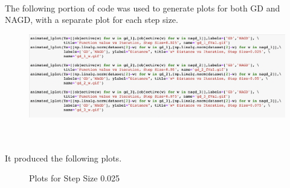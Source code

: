 \documentclass[12pt, letterpaper]{article}
\begin{document}
\\
The following portion of code was used to generate plots for both GD and NAGD, with a separate plot for each step size. \\
\begin{figure}[h!]
  \centering
  \includegraphics[scale=0.5]{./img/plots_by_step_size}
\end{figure}\\
\\
It produced the following plots.\\
\begin{figure}[h!]%
    \centering
    \qquad
    \caption{Plots for Step Size 0.025}%
    \label{fig:example}%
\end{figure}
\end{document}
